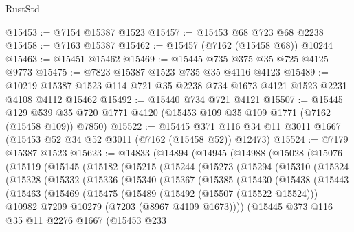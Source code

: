\begin{lexlean}{RustStd}
\begin{coremodule}
@15453 := @7154 @15387 @1523
@15457 := @15453 @68 @723 @68 @2238
@15458 := @7163 @15387
@15462 := @15457 (@7162 (@15458 @68)) @10244
@15463 := @15451 @15462
@15469 := @15445 @735 @375 @35 @725 @4125 @9773
@15475 := @7823 @15387 @1523 @735 @35 @4116 @4123
@15489 := @10219 @15387 @1523 @114 @721 @35 @2238 @734 @1673 @4121 @1523 @2231 @4108 @4112 @15462
@15492 := @15440 @734 @721 @4121
@15507 := @15445
    @129
    @539
    @35
    @720
    @1771
    @4120
    (@15453 @109 @35 @109 @1771 (@7162 (@15458 @109)) @7850)
@15522 := @15445
    @371
    @116
    @34
    @11
    @3011
    @1667
    (@15453 @52 @34 @52 @3011 (@7162 (@15458 @52)) @12473)
@15524 := @7179 @15387 @1523
@15623 := @14833
    (@14894
      (@14945
        (@14988
          (@15028
            (@15076
              (@15119
                (@15145
                  (@15182
                    (@15215
                      (@15244
                        (@15273
                          (@15294
                            (@15310
                              (@15324
                                (@15328
                                  (@15332
                                    (@15336
                                      (@15340
                                        (@15367
                                          (@15385
                                            (@15430
                                              (@15438
                                                (@15443
                                                  (@15463
                                                    (@15469
                                                      (@15475
                                                        (@15489
                                                          (@15492 (@15507 (@15522 @15524)))
                                                          @10982
                                                          @7209
                                                          @10279
                                                          (@7203 (@8967 @4109 @1673))))
                                                      (@15445
                                                        @373
                                                        @116
                                                        @35
                                                        @11
                                                        @2276
                                                        @1667
                                                        (@15453
                                                          @233

\end{coremodule}
\end{lexlean}
